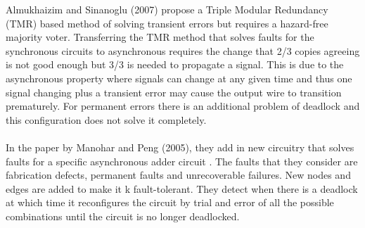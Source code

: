 \documentclass[12pt]{report}
\begin{document}
Almukhaizim and Sinanoglu (2007) propose a Triple Modular Redundancy (TMR) based method of solving transient errors but requires a hazard-free majority voter. Transferring the TMR method that solves faults for the synchronous circuits to asynchronous requires the change that 2/3 copies agreeing is not good enough but 3/3 is needed to propagate a signal. This is due to the asynchronous property where signals can change at any given time and thus one signal changing plus a transient error may cause the output wire to transition prematurely. For permanent errors there is an additional problem of deadlock and this configuration does not solve it completely. \\
\\
In the paper by Manohar and Peng (2005), they add in new circuitry that solves faults for a specific asynchronous adder circuit \cite{PengManohar_asyncadder}. The faults that they consider are fabrication defects, permanent faults and unrecoverable failures. New nodes and edges are added to make it k fault-tolerant. They detect when there is a deadlock at which time it reconfigures the circuit by trial and error of all the possible combinations until the circuit is no longer deadlocked. \\
\end{document}
